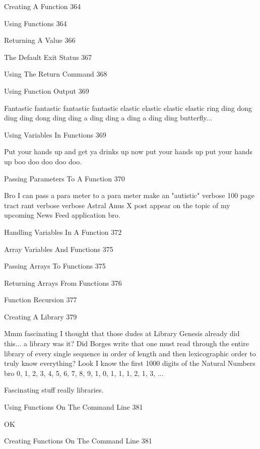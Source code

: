 Creating A Function 364



Using Functions 364



Returning A Value 366



The Default Exit Status 367



Using The Return Command 368



Using Function Output 369

Fantastic fantastic fantastic fantastic elastic elastic elastic elastic ring ding dong ding ding dong ding ding a ding ding a ding a ding ding butterfly...

Using Variables In Functions 369

Put your hands up and get ya drinks up now put your hands up put your hands up boo doo doo doo doo.

Passing Parameters To A Function 370

Bro I can pass a para meter to a para meter make an "autistic" verbose 100 page tract rant verbose verbose Astral Anus X post appear on the topic of my upcoming News Feed application bro.

Handling Variables In A Function 372



Array Variables And Functions 375



Passing Arrays To Functions 375



Returning Arrays From Functions 376



Function Recursion 377



Creating A Library 379

Mmm fascinating I thought that those dudes at Library Genesis already did this... a library was it? Did Borges write that one must read through the entire library of every single sequence in order of length and then lexicographic order to truly know everything? Look I know the first 1000 digits of the Natural Numbers bro 0, 1, 2, 3, 4, 5, 6, 7, 8, 9, 1, 0, 1, 1, 1, 2, 1, 3, ...

Fascinating stuff really libraries.

Using Functions On The Command Line 381

OK

Creating Functions On The Command Line 381



